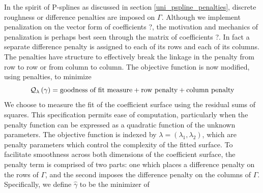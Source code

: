 \documentclass[12pt]{article}
\newcommand*\needsparaphrased{\color{red}}
\begin{document}
{\needsparaphrased In the spirit of P-splines as discussed in section \ref{uni_pspline_penalties}, discrete roughness or difference penalties are imposed on $\Gamma$. Although we implement penalization on the vector form of coefficients ?, the motivation and mechanics of penalization is perhaps best seen through the matrix of coefficients ?. In fact a separate difference penalty is assigned to each of its rows and each of its columns. The penalties have structure to effectively break the linkage in the penalty from row to row or from column to column. The objective function is now modified, using penalties, to minimize }
\begin{equation} \label{eq:tensor_diff_penalty_obj_function_in_words}
\mathcal{Q}_\lambda\left(\gamma\right) = \textup{goodness of fit measure} + \textup{row penalty} + \textup{column penalty}
\end{equation}
\noindent
We choose to measure the fit of the coefficient surface using the residual sums of squares. This specification permits ease of computation, particularly when the penalty function can be expressed as a quadratic function of the unknown parameters. The objective function is indexed by $\lambda = \left(\lambda_1, \lambda_2\right)$, which are penalty parameters which control the complexity of the fitted surface. To facilitate smoothness across both dimensions of the coefficient surface, the penalty term is comprised of two parts: one which places a difference penalty on the rows of $\Gamma$, and the second imposes the difference penalty on the columns of $\Gamma$. Specifically, we define $\hat{\gamma}$ to be the minimizer of 
\end{document}
